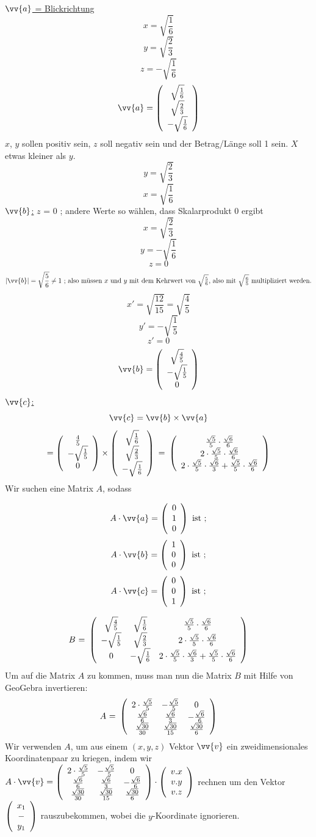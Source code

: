 \underline{$\vv{a}$ = Blickrichtung}
$$x = \sqrt{\frac{1}{6}}$$
$$y = \sqrt{\frac{2}{3}}$$
$$z = -\sqrt{\frac{1}{6}}$$
$$\vv{a}=\vektor{\sqrt{\frac{1}{6}}}{\sqrt{\frac{2}{3}}}{-\sqrt{\frac{1}{6}}} $$
$x$, $y$ sollen positiv sein, $z$ soll negativ sein und der Betrag/Länge soll 1 sein. $X$ etwas kleiner als $y$.
$$y= \sqrt{\frac{2}{3}}$$
$$x= \sqrt{\frac{1}{6}}$$
\underline{$\vv{b}$:}
$z$ = 0 ; andere Werte so wählen, dass Skalarprodukt 0 ergibt
$$x= \sqrt{\frac{2}{3}}$$
$$y=-\sqrt{\frac{1}{6}}$$
$$z=0$$
$$|\vv{b}| = \sqrt{\frac{5}{6}}\neq 1\mbox{ ; also müssen $x$ und $y$ mit dem Kehrwert von $\sqrt{\frac{5}{6}}$, also mit $\sqrt{\frac{6}{5}}$ multipliziert werden.}$$
$$x' = \sqrt{\frac{12}{15}} = \sqrt{\frac{4}{5}}$$
$$y' = - \sqrt{\frac{1}{5}}$$
$$z' = 0$$
$$\vv{b}= \vektor{\sqrt{\frac{4}{5}}}{-\sqrt{\frac{1}{5}}}{0}$$
\underline{$\vv{c}$:}
$$\vv{c} = \vv{b}\times  \vv{a}$$
$$= \left(\begin{array}{c}\frac{4}{5}\\-\sqrt{\frac{1}{5}}\\0\end{array}\right)
      \times \left(\begin{array}{c}\sqrt{\frac{1}{6}}\\\sqrt{\frac{2}{3}}\\-\sqrt{\frac{1}{6}}\end{array}\right) \mbox{ = } 
     \left(\begin{array}{c} 
     \frac{\sqrt{5}}{5}\cdot\frac{\sqrt{6}}{6}\\2\cdot\frac{\sqrt{5}}{5}\cdot\frac{\sqrt{6}}{6}\\2\cdot\frac{\sqrt{5}}{5}\cdot\frac{\sqrt{6}}{3}+\frac{\sqrt{5}}{5}\cdot\frac{\sqrt{6}}{6}\end{array}\right)
$$
Wir suchen eine Matrix $A$, sodass

     $$A\cdot \vv{a}=\vektor{0}{1}{0}\mbox{ ist ;} $$
     $$A\cdot \vv{b}=\vektor{1}{0}{0}\mbox{ ist ;}$$
     $$A\cdot \vv{c}=\vektor{0}{0}{1}\mbox{ ist ;} $$
     
$$\mbox{$B$ = } \left(\begin{array}{ccc} \sqrt{\frac{4}{5}}&\sqrt{\frac{1}{6}}&\frac{\sqrt{5}}{5} \cdot \frac{\sqrt{6}}{6}\\ -\sqrt{\frac{1}{5}}&\sqrt{\frac{2}{3}}&2 \cdot \frac{\sqrt{5}}{5} \cdot \frac{\sqrt{6}}{6}\\ 0&-\sqrt{\frac{1}{6}}&2 \cdot \frac{\sqrt{5}}{5} \cdot \frac{\sqrt{6}}{3} + \frac{\sqrt{5}}{5} \cdot \frac{\sqrt{6}}{6}\\ \end{array}\right)$$
Um auf die Matrix $A$ zu kommen, muss man nun die Matrix $B$ mit Hilfe von GeoGebra invertieren:
$$\mbox{$A$ = } \left(\begin{array}{ccc} 2\cdot\frac{\sqrt{5}}{5}&-\frac{\sqrt{5}}{5}&0\\ \frac{\sqrt{6}}{6}&\frac{\sqrt{6}}{3}&-\frac{\sqrt{6}}{6}\\ \frac{\sqrt{30}}{30}&\frac{\sqrt{30}}{15}&\frac{\sqrt{30}}{6}\\ \end{array}\right)$$
Wir verwenden $A$, um aus einem $(x,y,z)$ Vektor $\vv{v}$ ein zweidimensionales Koordinatenpaar zu kriegen, indem wir $ A \cdot \vv{v} = \m {2\cdot\frac{\sqrt{5}}{5}}{-\frac{\sqrt{5}}{5}}{0}{\frac{\sqrt{6}}{6}}{\frac{\sqrt{6}}{3}}{-\frac{\sqrt{6}}{6}}{\frac{\sqrt{30}}{30}}{\frac{\sqrt{30}}{15}}{\frac{\sqrt{30}}{6}} \cdot \vektor{v.x}{v.y}{v.z}$ rechnen um den Vektor $ \left(\begin{array}{c}x_1\\-\\y_1\end{array}\right)$ rauszubekommen, wobei die $y$-Koordinate ignorieren.  
